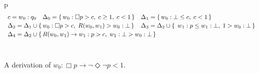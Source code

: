 \begin{figure}[t]
  \centering\small
  \begin{tabular}{p{\linewidth}}
    \[
    \begin{array}{ll}
      c=w_0:q_0\quad\Delta_0=\{\, w_0: \Box p > c,\; c \geq 1,\; c < 1\,\}&
      \Delta_1=\{\,  w_0:\bot \leq c,\;c < 1\,\}\\[.5ex]
      \Delta_2= \Delta_1\cup\{\, w_0: \Box p > c,\;  R(w_{0} ,w_{1}) > w_0:\bot\,\}&
      \Delta_3= \Delta_2\cup\{\,\;w_1: p\leq w_1:\bot,\; 1 > w_0:\bot   \,\}\\[.5ex]
      \multicolumn{2}{l}{\Delta_4= \Delta_2\cup\{\, R(w_{0} ,w_{1})\to w_1:p > c,\;w_1:\bot > w_0:\bot \,\}}\\
    \end{array}
    \]
    \\
  \end{tabular}
  \vspace{-3ex}
  \caption{A derivation  of $w_0: \Box p \to  \neg  \Diamond  \neg p  < 1$.}
  \label{fig:der}
\end{figure}



